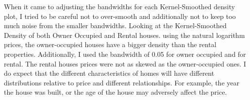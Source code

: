 \pagebreak
When it came to adjusting the bandwidths for each Kernel-Smoothed density plot, I tried to
be careful not to over-smooth and additionally not to keep too much noise from the smaller bandwidths. Looking at the Kernel-Smoothed Density of both Owner Occupied and Rental houses.
using the natural logarithm prices, the owner-occupied houses have a bigger density than the
rental properties. Additionally, I used the bandwidth of 0.05 for owner occupied and for rental.
The rental houses prices were not as skewed as the owner-occupied ones. I do expect that the
different characteristics of homes will have different distributions relative to price and different relationships. For example, the year the house was built, or the age of the house may adversely affect the price.



%
